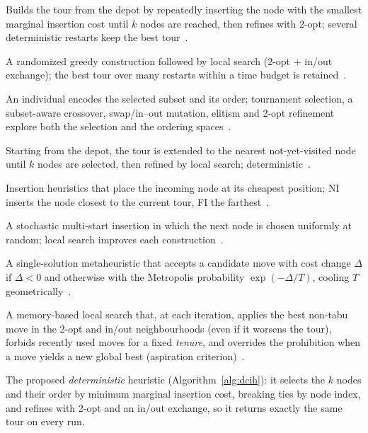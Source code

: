 \documentclass[12pt,a4paper,oneside]{report}
\begin{document}
\begin{description}[leftmargin=*,style=nextline]
  \item[Greedy (cheapest insertion).] Builds the tour from the depot by
  repeatedly inserting the node with the smallest marginal insertion cost until
  $k$ nodes are reached, then refines with 2-opt; several deterministic restarts
  keep the best tour~\cite{croes1958,rosenkrantz1977,gutin2002greedy}.
  \item[GRASP / multi-start.] A randomized greedy construction followed by local
  search (2-opt $+$ in/out exchange); the best tour over many restarts within a
  time budget is retained~\cite{feo1995grasp}.
  \item[Genetic Algorithm (GA).] An individual encodes the selected subset and
  its order; tournament selection, a subset-aware crossover, swap/in--out
  mutation, elitism and 2-opt refinement explore both the selection and the
  ordering spaces~\cite{holland1975adaptation,potvin1996}.
  \item[Nearest Neighbor (NN).] Starting from the depot, the tour is extended to
  the nearest not-yet-visited node until $k$ nodes are selected, then refined by
  local search; deterministic~\cite{rosenkrantz1977,johnson1997}.
  \item[Nearest / Farthest Insertion (NI, FI).] Insertion heuristics that place
  the incoming node at its cheapest position; NI inserts the node closest to the
  current tour, FI the farthest~\cite{rosenkrantz1977,bentley1992}.
  \item[Random Insertion (RI).] A stochastic multi-start insertion in which the
  next node is chosen uniformly at random; local search improves each
  construction~\cite{rosenkrantz1977,laporte1992}.
  \item[Simulated Annealing (SA).] A single-solution metaheuristic that accepts a
  candidate move with cost change $\Delta$ if $\Delta<0$ and otherwise with the
  Metropolis probability $\exp(-\Delta/T)$, cooling $T$
  geometrically~\cite{kirkpatrick1983,cerny1985}.
  \item[Tabu Search (TS).] A memory-based local search that, at each iteration,
  applies the best non-tabu move in the 2-opt and in/out neighbourhoods (even if
  it worsens the tour), forbids recently used moves for a fixed \emph{tenure}, and
  overrides the prohibition when a move yields a new global best (aspiration
  criterion)~\cite{glover1986,gloverlaguna1997,knox1994}.
  \item[DCIH (proposed).] The proposed \emph{deterministic} heuristic
  (Algorithm~\ref{alg:dcih}): it selects the $k$ nodes and their order by minimum
  marginal insertion cost, breaking ties by node index, and refines with 2-opt and
  an in/out exchange, so it returns exactly the same tour on every run.
\end{description}
\end{document}
